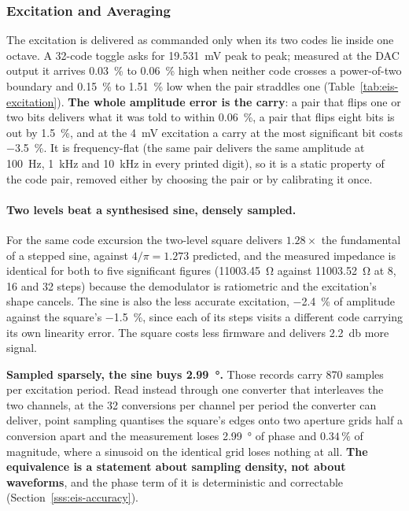 \subsubsection{Excitation and Averaging}\label{sss:eis-excitation}

The excitation is delivered as commanded only when its two codes lie inside one
octave. A \num{32}-code toggle asks for \SI{19.531}{\milli\volt} peak to peak;
measured at the DAC output it arrives \SI{0.03}{\percent} to
\SI{0.06}{\percent} high when neither code crosses a power-of-two boundary and
\SI{0.15}{\percent} to \SI{1.51}{\percent} low when the pair straddles one
(Table~\ref{tab:eis-excitation}). \textbf{The whole amplitude error is the
carry}: a pair that flips one or two bits delivers what it was told to within
\SI{0.06}{\percent}, a pair that flips eight bits is out by \SI{1.5}{\percent},
and at the \SI{4}{\milli\volt} excitation a carry at the most significant bit
costs \SI{-3.5}{\percent}. It is frequency-flat (the same pair delivers the
same amplitude at \SI{100}{\hertz}, \SI{1}{\kilo\hertz} and
\SI{10}{\kilo\hertz} in every printed digit), so it is a static property of
the code pair, removed either by choosing the pair or by calibrating it once.

\paragraph{Two levels beat a synthesised sine, densely sampled.} For the same code excursion the
two-level square delivers \(1.28\times\) the fundamental of a stepped sine,
against \(4/\pi = \num{1.273}\) predicted, and the measured impedance is
identical for both to five significant figures (\SI{11003.45}{\ohm} against
\SI{11003.52}{\ohm} at 8, 16 and 32 steps) because the demodulator is
ratiometric and the excitation's shape cancels. The sine is also the less
accurate excitation, \SI{-2.4}{\percent} of amplitude against the square's
\SI{-1.5}{\percent}, since each of its steps visits a different code carrying its
own linearity error. The square costs less firmware and delivers
\SI{2.2}{\decibel} more signal.

\textbf{Sampled sparsely, the sine buys \SI{2.99}{\degree}.} Those records carry
\num{870} samples per excitation period. Read instead through one converter that
interleaves the two channels, at the \num{32} conversions per channel per period
the converter can deliver, point sampling quantises the square's edges onto two
aperture grids half a conversion apart and the measurement loses
\SI{2.99}{\degree} of phase and \(0.34\,\%\) of magnitude, where a sinusoid on
the identical grid loses nothing at all. \textbf{The equivalence is a statement
about sampling density, not about waveforms}, and the phase term of it is
deterministic and correctable (Section~\ref{sss:eis-accuracy}).

